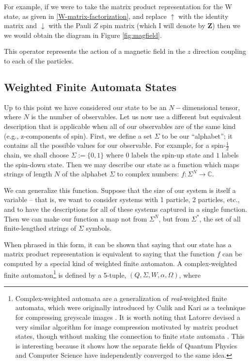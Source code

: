 \documentclass[12pt]{amsbook}
\theoremstyle{plain}
\theoremstyle{definition}
\theoremstyle{remark}
\newcommand{\half}{\frac{1}{2}}
\begin{document}
For example, if we were to take the matrix product representation for the W state, as given in \eqref{W-matrix-factorization}, and replace $\uparrow$ with the identity matrix and $\downarrow$ with the Pauli $Z$ spin matrix (which I will denote by \textbf{Z}) then we we would obtain the diagram in Figure \ref{fig:magfield}.

This operator represents the action of a magnetic field in the $z$ direction coupling to each of the particles.
\subsection{Weighted Finite Automata States}

Up to this point we have considered our state to be an $N-$dimensional tensor, where $N$ is the number of observables.  Let us now use a different but equivalent description that is applicable when all of our observables are of the same kind (e.g., z-components of spin).  First, we define a set $\Sigma$ to be our ``alphabet'';  it contains all the possible values for our observable.  For example, for a spin-$\half$ chain, we shall choose $\Sigma:=\{0,1\}$ where $0$ labels the spin-up state and $1$ labels the spin-down state.  Then we may describe our state as a function which maps strings of length $N$ of the alphabet $\Sigma$ to complex numbers:  $f: \Sigma^N\to \mathbb{C}$.

We can generalize this function.  Suppose that the size of our system is itself a variable -- that is, we want to consider systems with 1 particle, 2 particles, etc., and to have the descriptions for all of these systems captured in a single function.  Then we can make our function a map not from $\Sigma^N$, but from $\Sigma^*$, the set of all finite-lengthed strings of $\Sigma$ symbols.

When phrased in this form, it can be shown that saying that our state has a matrix product representation is equivalent to saying that the function $f$ can be computed by a special kind of weighted finite automaton.  A complex-weighted finite automaton\footnote{Complex-weighted automata are a generalization of \textit{real}-weighted finite automata, which were originally introduced by Culik and Kari as a technique for compressing greyscale images \cite{II:1993fk} \cite{II:fk} \cite{Jiang:2003wd}.  It is worth noting that Latorre devised a very similar algorithm for image compression motivated by matrix product states, though without making the connection to finite state automata \cite{Latorre2007}.  This is interesting because it shows how the separate fields of Quantum Physics and Computer Science have independently converged to the same idea.} is defined by a 5-tuple, $(Q,\Sigma,W,\alpha,\Omega)$, where
\end{document}
